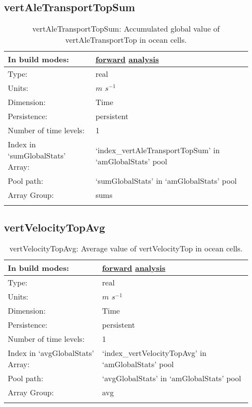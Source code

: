 \subsection[vertAleTransportTopSum]{vertAleTransportTopSum}
\label{subsec:var_sec_amGlobalStats_vertAleTransportTopSum}
\begin{center}
\begin{longtable}{| p{2.0in} | p{4.0in} |}
        \hline 
        In build modes: & \hyperref[subsec:forward_var_tab_amGlobalStats]{forward} \hyperref[subsec:analysis_var_tab_amGlobalStats]{analysis} \\
        \hline 
        Type: & real \\
        \hline 
        Units: & $m$ $s^{-1}$ \\
        \hline 
        Dimension: & Time \\
        \hline 
        Persistence: & persistent \\
        \hline 
        Number of time levels: & 1 \\
        \hline 
		 Index in `sumGlobalStats' Array: & `index\_vertAleTransportTopSum' in `amGlobalStats' pool \\
		 \hline 
            Pool path: & `sumGlobalStats' in `amGlobalStats' pool \\
		 \hline 
		 Array Group: & sums \\
		 \hline 
    \caption{vertAleTransportTopSum: Accumulated global value of vertAleTransportTop in ocean cells.}
\end{longtable}
\end{center}
\subsection[vertVelocityTopAvg]{vertVelocityTopAvg}
\label{subsec:var_sec_amGlobalStats_vertVelocityTopAvg}
\begin{center}
\begin{longtable}{| p{2.0in} | p{4.0in} |}
        \hline 
        In build modes: & \hyperref[subsec:forward_var_tab_amGlobalStats]{forward} \hyperref[subsec:analysis_var_tab_amGlobalStats]{analysis} \\
        \hline 
        Type: & real \\
        \hline 
        Units: & $m$ $s^{-1}$ \\
        \hline 
        Dimension: & Time \\
        \hline 
        Persistence: & persistent \\
        \hline 
        Number of time levels: & 1 \\
        \hline 
		 Index in `avgGlobalStats' Array: & `index\_vertVelocityTopAvg' in `amGlobalStats' pool \\
		 \hline 
            Pool path: & `avgGlobalStats' in `amGlobalStats' pool \\
		 \hline 
		 Array Group: & avg \\
		 \hline 
    \caption{vertVelocityTopAvg: Average value of vertVelocityTop in ocean cells.}
\end{longtable}
\end{center}
